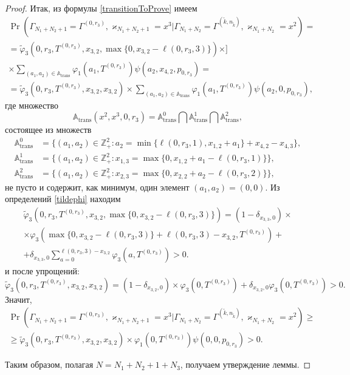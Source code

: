 \documentclass[a4paper,12pt,russian]{extarticle}
\begin{document}
\begin{proof}
Итак, из формулы \eqref{transitionToProve} имеем
\begin{multline*}
\Pr(\Gamma_{N_1+N_2+1}=\Gamma^{(0,r_3)}, \varkappa_{N_1+N_2+1}=x^{3}|
\Gamma_{N_1+N_2}=\Gamma^{(\tilde{k},n_{\tilde{k}})}, \varkappa_{N_1+N_2}=x^2)=\\
=\widetilde{\varphi}_3(0,r_3,T^{(0,r_3)},x_{3,2},\max{\{0,x_{3,2} - \ell(0,r_3,3)\}}) \times]\\ \times
\sum_{(a_1,a_2)\in {\mathbb A}_{\mathrm{trans}}}\varphi_1(a_1,T^{(0,r_3)})  \psi(a_2,x_{4,2}, p_{0,r_3}) =\\
=\widetilde{\varphi}_3(0,r_3,T^{(0,r_3)},x_{3,2},x_{3,2}) \times
\sum_{(a_1,a_2)\in {\mathbb A}_{\mathrm{trans}}}\varphi_1(a_1,T^{(0,r_3)})  \psi(a_2,0, p_{0,r_3}),
\end{multline*}
где множество 
\begin{equation*}
{\mathbb A}_{\mathrm{trans}}(x^2,x^{3},0,r_3) = {\mathbb A}_{\mathrm{trans}}^0 \bigcap {\mathbb A}_{\mathrm{trans}}^1\bigcap {\mathbb A}_{\mathrm{trans}}^2,
\end{equation*}
состоящее из множеств 
\begin{align*}
{\mathbb A}_{\mathrm{trans}}^0 &= \{(a_1,a_2) \in \mathbb{Z}_+^2 \colon a_2 = \min{\{\ell(0,r_3,1), x_{1,2}+a_1}\} +x_{4,2}- x_{4,3}\},\\
{\mathbb A}_{\mathrm{trans}}^1 &= \{(a_1,a_2) \in \mathbb{Z}_+^2 \colon x_{1,3}=\max{\{0,x_{1,2}+a_1-\ell(0,r_3,1)\}}\},\\
 {\mathbb A}_{\mathrm{trans}}^2 &= \{(a_1,a_2) \in \mathbb{Z}_+^2 \colon  x_{2,3} =\max{\{0,x_{2,2}+a_2-\ell(0,r_3,2)\}}\},
\end{align*}
не пусто и содержит, как минимум, один элемент $(a_1,a_2)=(0,0)$. Из определений \eqref{tildephi} находим
\begin{multline*}
\widetilde{\varphi}_3(0,r_3,T^{(0,r_3)},x_{3,2},\max{\{0,x_{3,2} - \ell(0,r_3,3)\}})= (1-\delta_{x_{3,3},0}) \times \\\times\varphi_3(\max{\{0,x_{3,2} - \ell(0,r_3,3)\}} + \ell (0,r_3,3) - x_{3,2},T^{(0,r_3)} ) 
+\\+\delta_{x_{3,3},0} \sum_{a=0}^{\ell(0,r_3,3)-x_{3,2}}\varphi_3 (a,T^{(0,r_3)})>0.
\end{multline*}
и после упрощений:
\begin{equation*}
\widetilde{\varphi}_3(0,r_3,T^{(0,r_3)},x_{3,2},x_{3,2})= (1-\delta_{x_{3,2},0}) \times \varphi_3(0,T^{(0,r_3)} ) 
+\delta_{x_{3,2},0} \varphi_3 (0,T^{(0,r_3)})>0.
\end{equation*}
Значит,
\begin{multline*}
\Pr(\Gamma_{N_1+N_2+1}=\Gamma^{(0,r_3)}, \varkappa_{N_1+N_2+1}=x^{3}|
\Gamma_{N_1+N_2}=\Gamma^{(\tilde{k},n_{\tilde{k}})}, \varkappa_{N_1+N_2}=x^2)\geqslant \\
\geqslant \widetilde{\varphi}_3(0,r_3,T^{(0,r_3)},x_{3,2},x_{3,2})
\times
\varphi_1(0,T^{(0,r_3)})  \psi(0,0, p_{0,r_3}) > 0.
\end{multline*}

Таким образом, полагая $N=N_1+N_2+1+N_3$, получаем утверждение леммы.
\end{proof}
\end{document}
